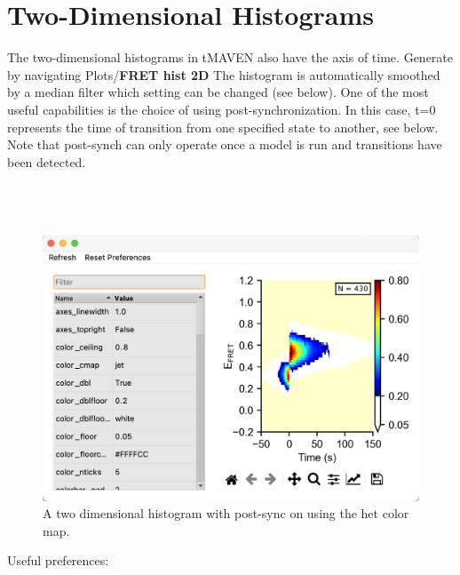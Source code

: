 \documentclass[11pt,a5paper,footinclude=true,headinclude=true]{scrbook} %
\begin{document}
\section{Two-Dimensional Histograms}
The two-dimensional histograms in tMAVEN also have the axis of time. Generate by navigating Plots/\textbf{FRET hist 2D} The histogram is automatically smoothed by a median  filter which setting can be changed (see below). One of the most useful capabilities is the choice of using post-synchronization. In this case, t=0 represents the time of transition from one specified state to another, see below. Note that post-synch can only operate once a model is run and transitions have been detected. \\ \\ \\ \\
\begin{figure} [t]
    \centering
    \includegraphics[scale=0.38]{2dHistoPostSyncFigure.png}
    \caption{A two dimensional histogram with post-sync on using the het color map.}
    \label{fig:my_label}

\end{figure}

\vspace*{-40pt}

Useful preferences:
\end{document}
